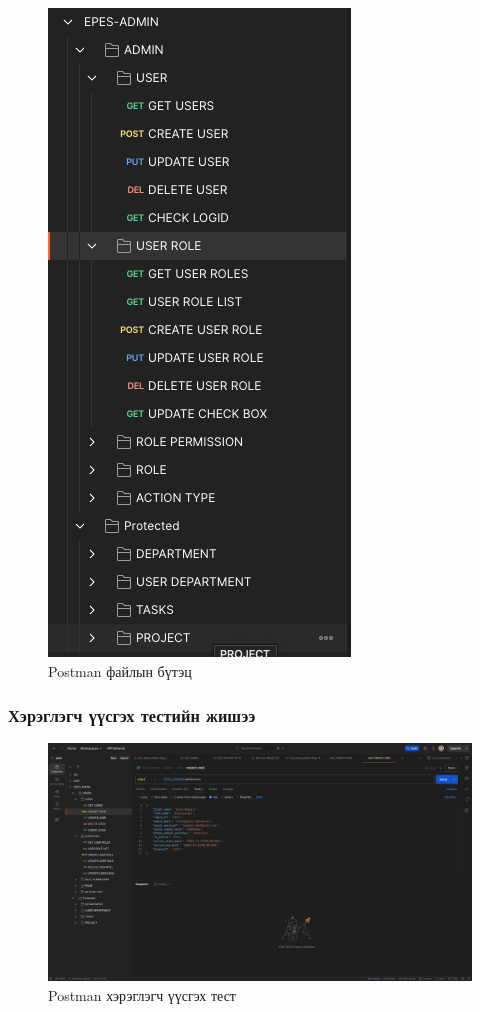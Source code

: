 \begin{figure}[H]
    \centering
    \includegraphics[scale=0.5]{src/images/uiux/postmanStruc.png}
    \caption{Postman файлын бүтэц}
    \label{fig:postman_file_struct}
\end{figure}

\subsubsection{Хэрэглэгч үүсгэх тестийн жишээ}

\begin{figure}[H]
    \centering
    \includegraphics[scale=0.25]{src/images/uiux/postmanCreateUser.png}
    \caption{Postman хэрэглэгч үүсгэх тест}
    \label{fig:postman_create_user}
\end{figure}